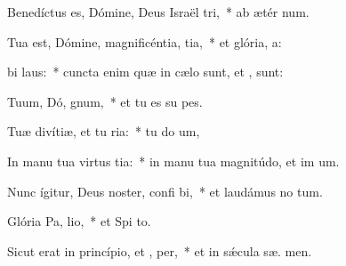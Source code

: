 \item Benedíctus es, Dómine, Deus Israël  tri,~* ab ætér  num.
\item Tua est, Dómine, magnificéntia,  tia,~* et glória,  a:
\item {} bi laus:~* cuncta enim quæ in cælo sunt, et  ,  sunt:
\item Tuum, Dó, gnum,~* et tu es su  pes.
\item Tuæ divítiæ, et tu  ria:~* tu do um,
\item In manu tua virtus  tia:~* in manu tua magnitúdo, et im um.
\item Nunc ígitur, Deus noster, confi bi,~* et laudámus no  tum.
\item Glória Pa,  lio,~* et Spi to.
\item Sicut erat in princípio, et ,  per,~* et in sǽcula sæ. men.
